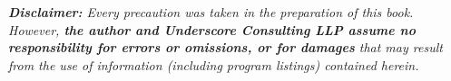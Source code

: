 \begin{center}

\textit{\textbf{Disclaimer:} Every precaution was taken in the preparation of this book. However, \textbf{the author and Underscore Consulting LLP assume no responsibility for errors or omissions, or for damages} that may result from the use of information (including program listings) contained herein.}

\end{center}
